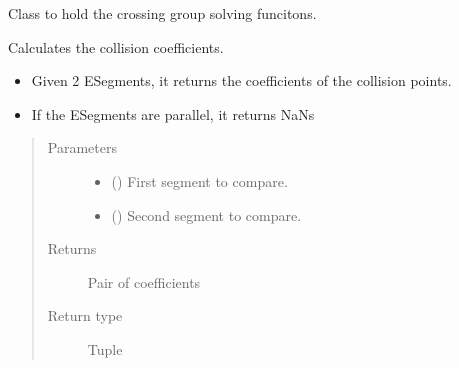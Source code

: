 \documentclass[letterpaper,10pt,english]{sphinxmanual}
\begin{document}
\begin{fulllineitems}
\label{\detokenize{reference:taipanPyRouter.CGroupSolver}}
Class to hold the crossing group solving funcitons.

\begin{fulllineitems}
\label{\detokenize{reference:taipanPyRouter.CGroupSolver.calcCoeffs}}
Calculates the collision coefficients.
\begin{itemize}
\item {} 
Given 2 ESegments, it returns the coefficients of the collision points.

\item {} 
If the ESegments are parallel, it returns NaNs

\end{itemize}
\begin{quote}\begin{description}
\item[{Parameters}] \leavevmode\begin{itemize}
\item {} 
 ({\hyperref[\detokenize{reference:taipanPyRouter.ESegment}]{}}) \textendash{} First segment to compare.

\item {} 
 ({\hyperref[\detokenize{reference:taipanPyRouter.ESegment}]{}}) \textendash{} Second segment to compare.

\end{itemize}

\item[{Returns}] \leavevmode
Pair of coefficients

\item[{Return type}] \leavevmode
Tuple

\end{description}\end{quote}

\end{fulllineitems}


\end{fulllineitems}
\end{document}
